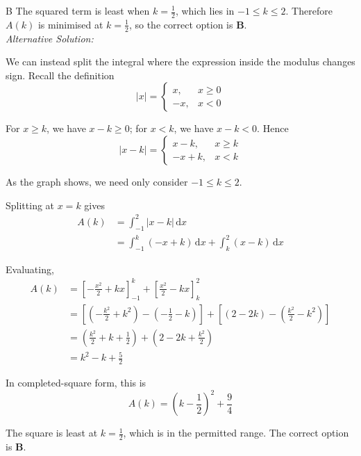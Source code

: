 \documentclass[11pt,a4paper]{article}
\begin{document}
\begin{enumerate}[label=\textbf{\arabic*.},leftmargin=*,itemsep=0pt,start=7]
\begin{djsSolution}{B}
The squared term is least when $k=\frac12$, which lies in $-1\le k\le2$. Therefore $A(k)$ is minimised at $k=\frac12$, so the correct option is \textbf{B}.\\[5pt]

\textit{Alternative Solution:}

We can instead split the integral where the expression inside the modulus changes sign. Recall the definition
\[
|x|=\begin{cases}
x,&x\ge0\\[5pt]
-x,&x<0
\end{cases}
\]

For $x\ge k$, we have $x-k\ge0$; for $x<k$, we have $x-k<0$. Hence
\[
|x-k|=\begin{cases}
x-k,&x\ge k\\[5pt]
-x+k,&x<k
\end{cases}
\]

As the graph shows, we need only consider $-1\le k\le2$.

Splitting at $x=k$ gives
\begin{align*}
    A(k)&= \int_{-1}^{2} |x-k|\,\mathrm{d}x  \\[8pt]
        &=\int_{-1}^{k}(-x+k)\,\mathrm{d}x+\int_k^2(x-k)\,\mathrm{d}x
\end{align*}



Evaluating,
\[
\begin{aligned}
A(k)
&=\left[-\frac{x^2}{2}+kx\right]_{-1}^{k}
 +\left[\frac{x^2}{2}-kx\right]_{k}^{2}\\[8pt]
&=\left[\left(-\frac{k^2}{2}+k^2\right)-\left(-\frac12-k\right)\right]
 +\left[(2-2k)-\left(\frac{k^2}{2}-k^2\right)\right]\\[8pt]
&=\left(\frac{k^2}{2}+k+\frac12\right)
 +\left(2-2k+\frac{k^2}{2}\right)\\[8pt]
&=k^2-k+\frac52
\end{aligned}
\]

In completed-square form, this is
\[
A(k)=\left(k-\frac12\right)^2+\frac94
\]

The square is least at $k=\frac12$, which is in the permitted range. The correct option is \textbf{B}.
\end{djsSolution}
\end{enumerate}
\clearpage
\thispagestyle{djssolutions}
\vspace*{8pt}
\end{document}

